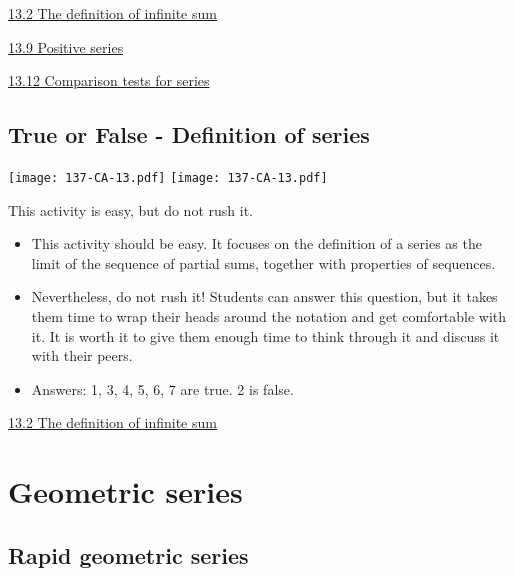 \documentclass[11pt]{article}
\newcommand{\nl}{\hfill \vspace{-1.1\baselineskip}} %
\newcommand{\vii}{\hspace{8mm} \href{https://www.youtube.com/watch?v=VccmKguRkeY&list=PLlwePzQY_wW-FJMnD_ybkXU_jZLVtZttI&index=2}{13.2 The definition of infinite sum} }
\newcommand{\vix}{\hspace{8mm} \href{https://www.youtube.com/watch?v=_7qwFfSjBtE&list=PLlwePzQY_wW-FJMnD_ybkXU_jZLVtZttI&index=9}{13.9 Positive series} }
\newcommand{\vxii}{\hspace{8mm} \href{https://www.youtube.com/watch?v=QbYK4COJUqU&list=PLlwePzQY_wW-FJMnD_ybkXU_jZLVtZttI&index=12}{13.12 Comparison tests for series} }
\begin{document}
\begin{videos}
\vii

\vix

\vxii
\end{videos}

\newpage
\subsection{True or False - Definition of series}

\begin{center}
{ \texttt{[image: 137-CA-13.pdf]}} \quad
{ \texttt{[image: 137-CA-13.pdf]}} 
\end{center}

\begin{warning}
This activity is easy, but do not rush it.
\end{warning}

\begin{comments}
\nl
	\begin{itemize}
		\item   This activity should be easy.  It focuses on the definition of a series as the limit of the sequence of partial sums, together with properties of sequences.
		
		\item Nevertheless, do not rush it!   Students can answer this question, but it takes them time to wrap their heads around the notation and get comfortable with it.   It is worth it to give them enough time to think through it and discuss it with their peers. 
		
		\item Answers: 1, 3, 4, 5, 6, 7 are true.  2 is false.
	\end{itemize}
\end{comments}

\begin{videos}
\vii
\end{videos}

\newpage
\section{Geometric series}
\subsection{Rapid geometric series}
\end{document}
